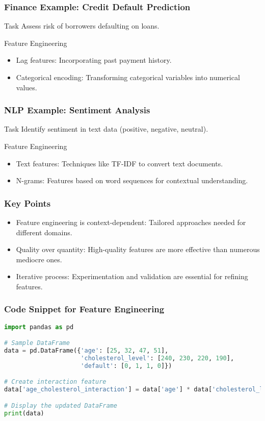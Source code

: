 \documentclass[aspectratio=169]{beamer}
\begin{document}
\begin{frame}
    \frametitle{Finance Example: Credit Default Prediction}
    \begin{block}{Task}
        Assess risk of borrowers defaulting on loans.
    \end{block}
    \begin{block}{Feature Engineering}
        \begin{itemize}
            \item Lag features: Incorporating past payment history.
            \item Categorical encoding: Transforming categorical variables into numerical values.
        \end{itemize}
    \end{block}
\end{frame}

\begin{frame}
    \frametitle{NLP Example: Sentiment Analysis}
    \begin{block}{Task}
        Identify sentiment in text data (positive, negative, neutral).
    \end{block}
    \begin{block}{Feature Engineering}
        \begin{itemize}
            \item Text features: Techniques like TF-IDF to convert text documents.
            \item N-grams: Features based on word sequences for contextual understanding.
        \end{itemize}
    \end{block}
\end{frame}

\begin{frame}
    \frametitle{Key Points}
    \begin{itemize}
        \item Feature engineering is context-dependent: Tailored approaches needed for different domains.
        \item Quality over quantity: High-quality features are more effective than numerous mediocre ones.
        \item Iterative process: Experimentation and validation are essential for refining features.
    \end{itemize}
\end{frame}

\begin{frame}[fragile]
    \frametitle{Code Snippet for Feature Engineering}
    \begin{lstlisting}[language=Python]
import pandas as pd

# Sample DataFrame
data = pd.DataFrame({'age': [25, 32, 47, 51],
                     'cholesterol_level': [240, 230, 220, 190],
                     'default': [0, 1, 1, 0]})

# Create interaction feature
data['age_cholesterol_interaction'] = data['age'] * data['cholesterol_level']

# Display the updated DataFrame
print(data)
    \end{lstlisting}
\end{frame}
\end{document}
